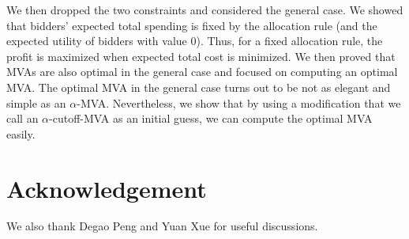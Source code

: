 \documentclass{aamas2013}
\begin{document}
We then dropped the two constraints and considered the general case.  We showed
that bidders' expected total spending is fixed by the allocation rule (and the
expected utility of bidders with value $0$). Thus, for a fixed allocation rule,
the profit is maximized when expected total cost is minimized.  We then proved
that MVAs are also optimal in the general case and focused on computing an
optimal MVA.  The optimal MVA in the general case turns out to be not as
elegant and simple as an $\alpha$-MVA.  Nevertheless, we show that by using a
modification that we call an $\alpha$-cutoff-MVA as an initial guess, we can
compute the optimal MVA easily.

\section{Acknowledgement}

We also thank Degao Peng and Yuan Xue for useful discussions.



\end{document}
